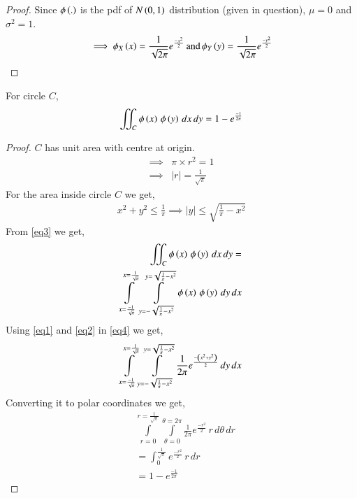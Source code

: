 \documentclass[journal,12pt,twocolumn]{IEEEtran}
\begin{document}
\begin{proof}
Since $\phi\left(.\right)$ is the pdf of $N\left(0,1\right)$ distribution (given in question),
$\mu = 0$ and $\sigma^2 = 1$.
\begin{align*}
    \implies \phi_X\left(x\right) = \frac{1}{\sqrt{2\pi}}e^\frac{-x^2}{2}\,\text{and}\,
    \phi_Y\left(y\right) = \frac{1}{\sqrt{2\pi}}e^\frac{-y^2}{2}
\end{align*}
\end{proof}

\begin{lemma}
For circle $C$,
\begin{align}
    \iint_C{\phi\left(x\right)\,\phi\left(y\right)\,dx\,dy} = 1 - e^{\frac{-1}{2\pi}}  \label{eq9}
\end{align}
\end{lemma}

\begin{proof}
$C$ has unit area with centre at origin.
\begin{align}
    \implies &\pi\times r^2=1\\
    \implies &|r| = \frac{1}{\sqrt{\pi}}
\end{align}
For the area inside circle $C$ we get,
\begin{align}
    x^2+y^2\leq \frac{1}{\pi}
    \implies |y| \leq \sqrt{\frac{1}{\pi}-x^2}\label{eq3}
\end{align}
From \eqref{eq3} we get,
\begin{align}
    \iint_C{\phi\left(x\right)\,\phi\left(y\right)\,dx\,dy} = \nonumber\\
    \int\limits_{x=\frac{-1}{\sqrt{\pi}}}^{x=\frac{1}{\sqrt{\pi}}}\, \int\limits_{y=-\sqrt{\frac{1}{\pi}-x^2}}^{y=\sqrt{\frac{1}{\pi}-x^2}} \phi\left(x\right)\,\phi\left(y\right)\,dy\,dx \label{eq4}
\end{align}
Using \eqref{eq1} and \eqref{eq2} in \eqref{eq4} we get,
\begin{align}
    \int\limits_{x=\frac{-1}{\sqrt{\pi}}}^{x=\frac{1}{\sqrt{\pi}}} \int\limits_{y=-\sqrt{\frac{1}{\pi}-x^2}}^{y=\sqrt{\frac{1}{\pi}-x^2}} \frac{1}{2\pi}e^\frac{-\left(x^2+y^2\right)}{2}\,dy\,dx
\end{align}
Converting it to polar coordinates we get,
\begin{align}
    &\int\limits_{r=0}^{r=\frac{1}{\sqrt{\pi}}} \int\limits_{\theta=0}^{\theta=2\pi} \frac{1}{2\pi}e^\frac{-r^2}{2}\,r\,d\theta\,dr\\
    &= \int_{0}^{\frac{1}{\sqrt{\pi}}}e^\frac{-r^2}{2}\,r\,dr\\
    &= 1 - e^{\frac{-1}{2\pi}}
\end{align}
\end{proof}
\end{document}
